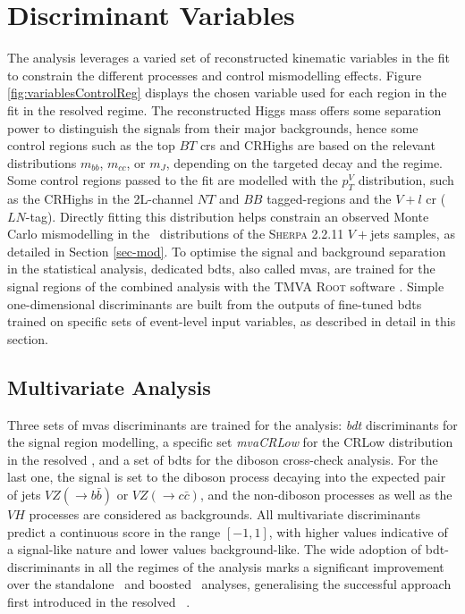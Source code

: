 \section{Discriminant Variables}\label{sec-vh-disc}
The analysis leverages a varied set of reconstructed kinematic variables in the fit to constrain the different processes and control mismodelling effects. Figure \ref{fig:variablesControlReg} displays the chosen variable used for each region in the fit in the resolved regime. The reconstructed Higgs mass offers some separation power to distinguish the signals from their major backgrounds, hence some control regions such as the top $BT$ \glspl{cr} and CRHighs are based on the relevant distributions $m_{bb}$, $m_{cc}$, or $m_J$, depending on the targeted decay and the regime. Some control regions passed to the fit are modelled with the $p_T^V$ distribution, such as the CRHighs in the 2L-channel $NT$ and $BB$ tagged-regions and the $V+l$ \gls{cr} ($LN$-tag). Directly fitting this distribution helps constrain an observed Monte Carlo mismodelling in the \ptv\ distributions of the \textsc{Sherpa} 2.2.11 $V+$jets samples, as detailed in Section \ref{sec-mod}. To optimise the signal and background separation in the statistical analysis, dedicated \glspl{bdt}, also called \glspl{mva}, are trained for the signal regions of the combined analysis with the \textsc{TMVA} \textsc{Root} software \cite{Therhaag:2011jh}. Simple one-dimensional discriminants are built from the outputs of fine-tuned \glspl{bdt} trained on specific sets of event-level input variables, as described in detail in this section.

\subsection{Multivariate Analysis}
Three sets of \glspl{mva} discriminants are trained for the analysis: \textit{\gls{bdt}} discriminants for the signal region modelling, a specific set \textit{mvaCRLow} for the CRLow distribution in the resolved \vhb, and a set of \glspl{bdt} for the diboson cross-check analysis. For the last one, the signal is set to the diboson process decaying into the expected pair of jets $VZ(\rightarrow b\bar{b})$ or $VZ(\rightarrow c\bar{c})$, and the non-diboson processes as well as the $VH$ processes are considered as backgrounds. All multivariate discriminants predict a continuous score in the range $[-1, 1]$, with higher values indicative of a signal-like nature and lower values background-like. The wide adoption of \gls{bdt}-discriminants in all the regimes of the analysis marks a significant improvement over the standalone \vhc\ and boosted \vhb\ analyses, generalising the successful approach first introduced in the resolved \vhb\ \cite{ATLAS:2020fcp}.\\

